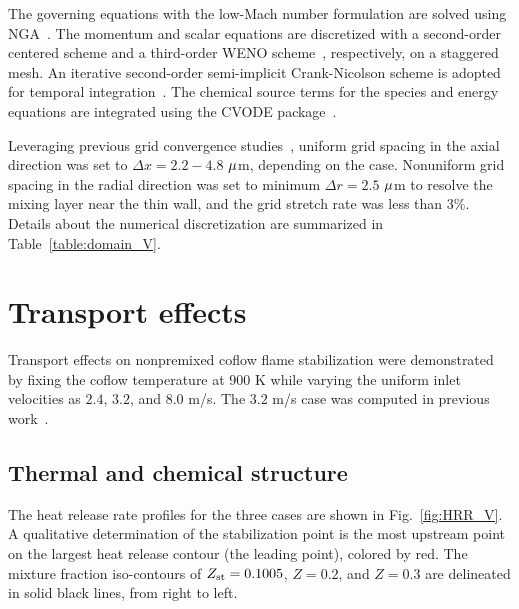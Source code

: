 \documentclass[review,3p,times]{elsarticle}
\begin{document}
The governing equations with the low-Mach number formulation are solved using NGA~\cite{desjardins08}.  The momentum and scalar equations are discretized with a second-order centered scheme and a third-order WENO scheme~\cite{liu94}, respectively, on a staggered mesh.  An iterative second-order semi-implicit Crank-Nicolson scheme is adopted for temporal integration~\cite{pierce01}.  The chemical source terms for the species and energy equations are integrated using the CVODE package~\cite{cohen96}.

Leveraging previous grid convergence studies~\cite{deng15}, uniform grid spacing in the axial direction was set to $\Delta x = 2.2-4.8$ ${\rm \mu}$m, depending on the case.  Nonuniform grid spacing in the radial direction was set to minimum $\Delta r = 2.5$ ${\rm \mu}$m to resolve the mixing layer near the thin wall, and the grid stretch rate was less than $3$\%.  Details about the numerical discretization are summarized in Table~\ref{table:domain_V}.      


\section{Transport effects}

Transport effects on nonpremixed coflow flame stabilization were demonstrated by fixing the coflow temperature at $900$ K while varying the uniform inlet velocities as $2.4$, $3.2$, and $8.0$ m/s.  The $3.2$ m/s case was computed in previous work~\cite{deng15}.  

\begin{table}
  \caption{Computational domain and number of grid points.}
  \label{table:domain_V}
  \centering
  \normalsize
\end{table}

\subsection{Thermal and chemical structure}  
The heat release rate profiles for the three cases are shown in Fig.~\ref{fig:HRR_V}.  A qualitative determination of the stabilization point is the most upstream point on the largest heat release contour (the leading point), colored by red.  The mixture fraction iso-contours of $Z_{\rm st} = 0.1005$, $Z = 0.2$, and $Z = 0.3$ are delineated in solid black lines, from right to left.
\end{document}
